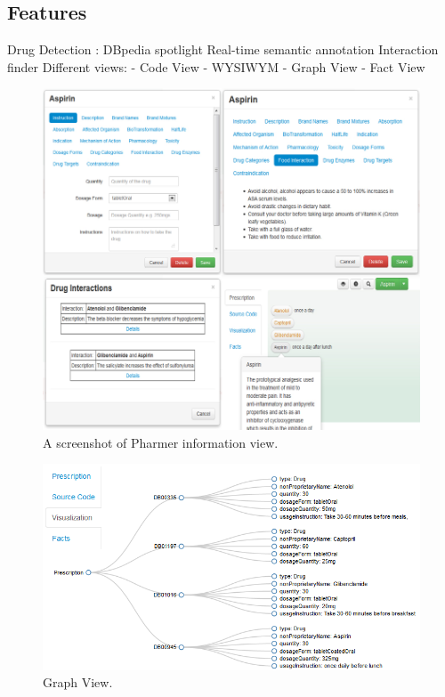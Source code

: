 \documentclass[10pt, conference, compsocconf]{IEEEtran}
\begin{document}
\subsection{Features}
Drug Detection : DBpedia spotlight
Real-time semantic annotation
Interaction finder
Different views:
- Code View
- WYSIWYM
- Graph View
- Fact View

\begin{figure}[tb]
	\centering
		\includegraphics[width=2.0\columnwidth]{images/screenshot1.jpg}
	\caption{A screenshot of Pharmer information view.}
	\label{fig:wysiwym}
\end{figure}

\begin{figure}[tb]
	\centering
		\includegraphics[width=1.0\columnwidth]{images/sc2.png}
	\caption{Graph View.}
	\label{fig:graphview}
\end{figure}
\end{document}
